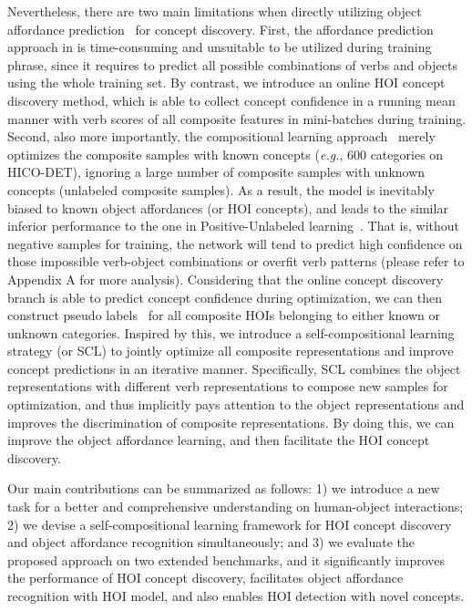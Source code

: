 \documentclass[runningheads]{llncs}
\newcommand{\eg}{\textit{e.g.}}
\begin{document}
Nevertheless, there are two main limitations when directly utilizing object affordance prediction~\cite{hou2021atl} for concept discovery. First, the affordance prediction approach in \cite{hou2021atl} is time-consuming and unsuitable to be utilized during training phrase, since it requires to predict all possible combinations of verbs and objects using the whole training set. By contrast, we introduce an online HOI concept discovery method, which is able to collect concept confidence in a running mean manner with verb scores of all composite features in mini-batches during training. Second, also more importantly, the compositional learning approach~\cite{hou2021atl} merely optimizes the composite samples with known concepts (\eg, 600 categories on HICO-DET), ignoring a large number of  composite samples with unknown concepts (unlabeled composite samples). As a result, the model is inevitably biased to known object affordances (or HOI concepts), and leads to the similar inferior performance to the one in Positive-Unlabeled learning~\cite{de1999positive,elkan2008learning,scott2009novelty}. That is, without negative samples for training, the network will tend to predict high confidence on those impossible verb-object combinations or overfit verb patterns (please refer to Appendix A for more analysis). Considering that the online concept discovery branch is able to predict concept confidence during optimization, we can then construct pseudo labels~\cite{lee2013pseudo} for all composite HOIs belonging to either known or unknown categories. Inspired by this, we introduce a self-compositional learning strategy (or SCL) to jointly optimize all composite representations and improve concept predictions in an iterative manner. Specifically, SCL combines the object representations with different verb representations to compose new samples for optimization, and thus implicitly pays attention to the object representations and improves the discrimination of composite representations. By doing this, we can improve the object affordance learning, and then facilitate the HOI concept discovery. 












Our main contributions can be summarized as follows: 1) we introduce a new task for a better and comprehensive understanding on human-object interactions; 2) we devise a self-compositional learning framework for HOI concept discovery and object affordance recognition simultaneously; and 3) we evaluate the proposed approach on two extended benchmarks, and it significantly improves the performance of HOI concept discovery, facilitates object affordance recognition with HOI model, and also enables HOI detection with novel concepts.
\end{document}
